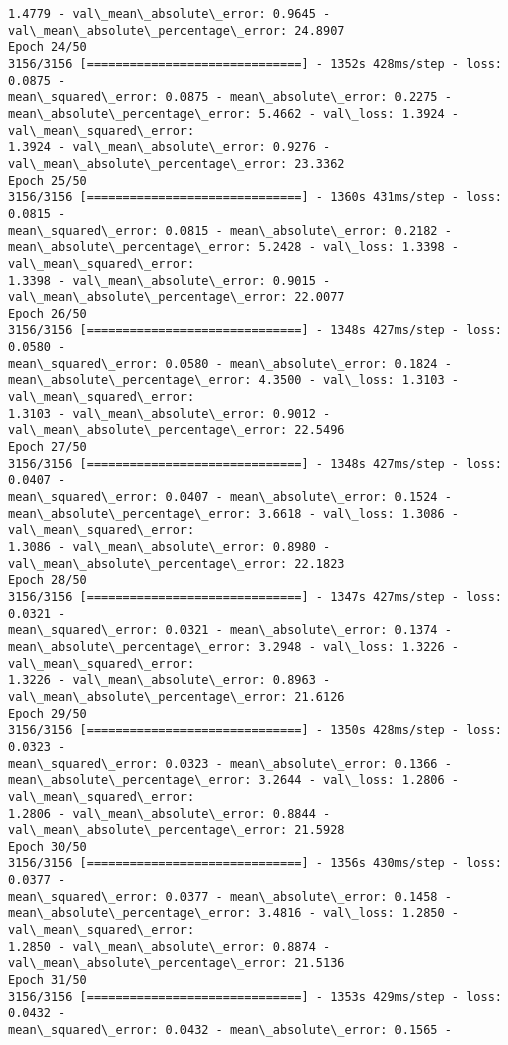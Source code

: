 \documentclass[11pt]{article}
\begin{document}
\begin{Verbatim}[commandchars=\\\{\},fontsize=\footnotesize]
1.4779 - val\_mean\_absolute\_error: 0.9645 - val\_mean\_absolute\_percentage\_error: 24.8907
Epoch 24/50
3156/3156 [==============================] - 1352s 428ms/step - loss: 0.0875 -
mean\_squared\_error: 0.0875 - mean\_absolute\_error: 0.2275 -
mean\_absolute\_percentage\_error: 5.4662 - val\_loss: 1.3924 - val\_mean\_squared\_error:
1.3924 - val\_mean\_absolute\_error: 0.9276 - val\_mean\_absolute\_percentage\_error: 23.3362
Epoch 25/50
3156/3156 [==============================] - 1360s 431ms/step - loss: 0.0815 -
mean\_squared\_error: 0.0815 - mean\_absolute\_error: 0.2182 -
mean\_absolute\_percentage\_error: 5.2428 - val\_loss: 1.3398 - val\_mean\_squared\_error:
1.3398 - val\_mean\_absolute\_error: 0.9015 - val\_mean\_absolute\_percentage\_error: 22.0077
Epoch 26/50
3156/3156 [==============================] - 1348s 427ms/step - loss: 0.0580 -
mean\_squared\_error: 0.0580 - mean\_absolute\_error: 0.1824 -
mean\_absolute\_percentage\_error: 4.3500 - val\_loss: 1.3103 - val\_mean\_squared\_error:
1.3103 - val\_mean\_absolute\_error: 0.9012 - val\_mean\_absolute\_percentage\_error: 22.5496
Epoch 27/50
3156/3156 [==============================] - 1348s 427ms/step - loss: 0.0407 -
mean\_squared\_error: 0.0407 - mean\_absolute\_error: 0.1524 -
mean\_absolute\_percentage\_error: 3.6618 - val\_loss: 1.3086 - val\_mean\_squared\_error:
1.3086 - val\_mean\_absolute\_error: 0.8980 - val\_mean\_absolute\_percentage\_error: 22.1823
Epoch 28/50
3156/3156 [==============================] - 1347s 427ms/step - loss: 0.0321 -
mean\_squared\_error: 0.0321 - mean\_absolute\_error: 0.1374 -
mean\_absolute\_percentage\_error: 3.2948 - val\_loss: 1.3226 - val\_mean\_squared\_error:
1.3226 - val\_mean\_absolute\_error: 0.8963 - val\_mean\_absolute\_percentage\_error: 21.6126
Epoch 29/50
3156/3156 [==============================] - 1350s 428ms/step - loss: 0.0323 -
mean\_squared\_error: 0.0323 - mean\_absolute\_error: 0.1366 -
mean\_absolute\_percentage\_error: 3.2644 - val\_loss: 1.2806 - val\_mean\_squared\_error:
1.2806 - val\_mean\_absolute\_error: 0.8844 - val\_mean\_absolute\_percentage\_error: 21.5928
Epoch 30/50
3156/3156 [==============================] - 1356s 430ms/step - loss: 0.0377 -
mean\_squared\_error: 0.0377 - mean\_absolute\_error: 0.1458 -
mean\_absolute\_percentage\_error: 3.4816 - val\_loss: 1.2850 - val\_mean\_squared\_error:
1.2850 - val\_mean\_absolute\_error: 0.8874 - val\_mean\_absolute\_percentage\_error: 21.5136
Epoch 31/50
3156/3156 [==============================] - 1353s 429ms/step - loss: 0.0432 -
mean\_squared\_error: 0.0432 - mean\_absolute\_error: 0.1565 -

\end{Verbatim}
\end{document}
